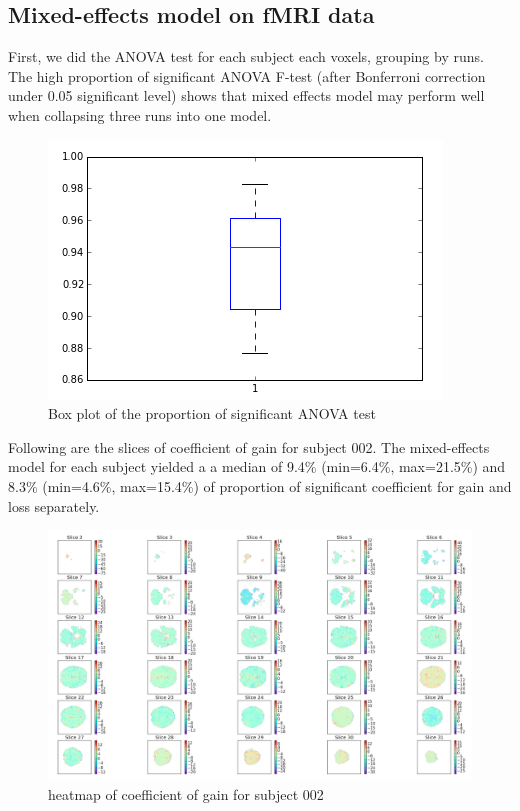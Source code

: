 \subsection{Mixed-effects model on fMRI data}
First, we did the ANOVA test for each subject each voxels, grouping by runs. 
The high proportion of significant ANOVA F-test (after  Bonferroni correction 
under 0.05 significant level) shows that mixed effects model may perform well 
when collapsing three runs into one model. 
\begin{figure}[H]
\caption{Box plot of the proportion of significant ANOVA test}
    \centering
        \includegraphics[scale=0.45]{figures/anova_prop.png}
\end{figure}
Following are the slices of coefficient of gain for subject 002. The 
mixed-effects model for each subject yielded a a median of 9.4\% (min=6.4\%, 
max=21.5\%) and 8.3\% (min=4.6\%, max=15.4\%) of proportion of significant 
coefficient for gain and loss separately. 
\begin{figure}[H]
\caption{heatmap of coefficient of gain for subject 002}
    \centering
        \includegraphics[scale=0.35]{figures/sub002_lme_beta_gain.png}
\end{figure}



